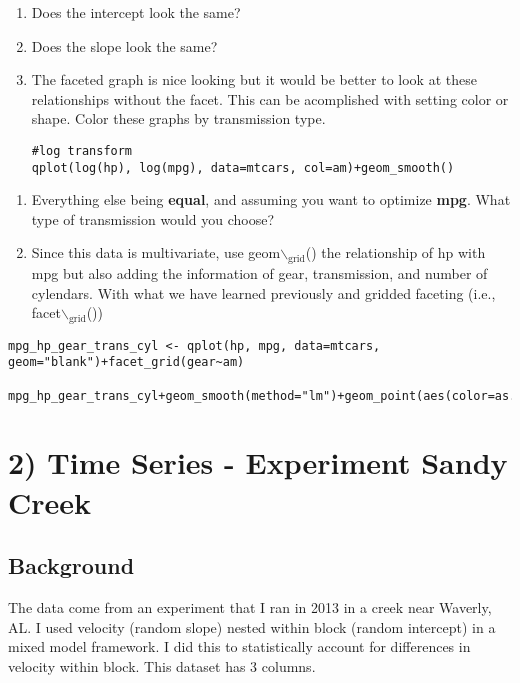 \documentclass[11pt]{article}
\begin{document}
\begin{enumerate}
\item Does the intercept look the same?

\item Does the slope look the same?

\item The faceted graph is nice looking but it would be better to look at these relationships without the facet. This can be acomplished with setting color or shape. Color these graphs by transmission type.

\lstset{language=R,label= ,caption= ,captionpos=b,numbers=none}
\begin{lstlisting}
#log transform
qplot(log(hp), log(mpg), data=mtcars, col=am)+geom_smooth()
\end{lstlisting}
\end{enumerate}


\begin{enumerate}
\item Everything else being \textbf{equal}, and assuming you want to optimize \textbf{mpg}. What type of transmission would you choose?

\item Since this data is multivariate, use geom$\backslash$\(_{\text{grid}}\)() the relationship of hp with mpg but also adding the information of gear, transmission, and number of cylendars. With what we have learned previously and gridded faceting (i.e., facet$\backslash$\(_{\text{grid}}\)())
\end{enumerate}

\lstset{language=R,label= ,caption= ,captionpos=b,numbers=none}
\begin{lstlisting}
mpg_hp_gear_trans_cyl <- qplot(hp, mpg, data=mtcars, geom="blank")+facet_grid(gear~am)

mpg_hp_gear_trans_cyl+geom_smooth(method="lm")+geom_point(aes(color=as.factor(cyl)))
\end{lstlisting}

\section{2) Time Series - Experiment Sandy Creek}
\label{sec:orgheadline8}

\subsection{Background}
\label{sec:orgheadline4}
The data come from an experiment that I ran in 2013 in a creek near Waverly, AL. I used velocity (random slope) nested within block (random intercept) in a mixed model framework. I did this to statistically account for differences in velocity within block. This dataset has 3 columns.
\end{document}
